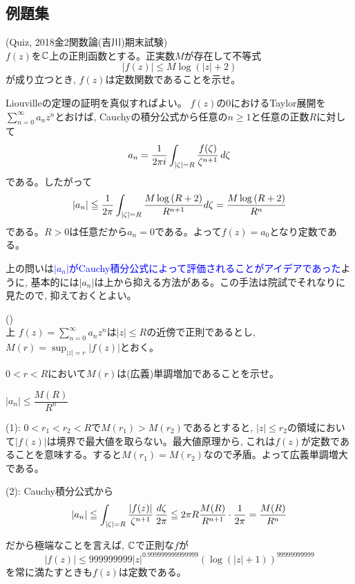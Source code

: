 \subsection{例題集} \label{subsection:c-analysis_egprobs1}
\begin{egprob} (Quiz, 2018金2関数論(吉川)期末試験)\\
$f(z)$を$\mathbb{C}$上の正則函数とする。正実数$M$が存在して不等式
\[|f(z)| \leq M\log{(|z| + 2)}\]
が成り立つとき, $f(z)$は定数関数であることを示せ。
\end{egprob}

\begin{egans} Liouvilleの定理の証明を真似すればよい。
$f(z)$の$0$におけるTaylor展開を$\sum_{n=0}^{\infty}a_nz^{n}$とおけば, Cauchyの積分公式から任意の$n\geq 1$と任意の正数$R$に対して
\[a_n = \dfrac{1}{2\pi i} \displaystyle\int_{|\zeta|=R} \dfrac{f(\zeta)}{\zeta^{n+1}}\, d\zeta\]
である。したがって
\[|a_n| \leqq \dfrac{1}{2\pi} \displaystyle\int_{|\zeta|=R} \dfrac{M\log{(R+2)}}{R^{n+1}}d\zeta = \dfrac{M\log{(R+2)}}{R^{n}}\]
である。$R>0$は任意だから$a_n=0$である。よって$f(z) = a_0$となり定数である。
\end{egans}

上の問いは\textcolor{blue}{$|a_n|$がCauchy積分公式によって評価されることがアイデアであった}ように, 基本的には$|a_n|$は上から抑える方法がある。この手法は院試でそれなりに見たので, 抑えておくとよい。


\begin{egprob} ()\\
上
$f(z) = \sum_{n=0}^{\infty}a_nz^{n}$は$|z|\leq R$の近傍で正則であるとし, $M(r) = \sup_{|z|=r}|f(z)|$とおく。
\ben
\item $0<r<R$において$M(r)$は(広義)単調増加であることを示せ。
\item $|a_n| \leq \dfrac{M(R)}{R^{n}}$
\een
\end{egprob}
\begin{egans}
(1): $0<r_1<r_2<R$で$M(r_1)>M(r_2)$であるとすると, $|z|\leq r_2$の領域において$|f(z)|$は境界で最大値を取らない。最大値原理から, これは$f(z)$が定数であることを意味する。すると$M(r_1) = M(r_2)$なので矛盾。よって広義単調増大である。

(2): Cauchy積分公式から
\[|a_n| \leqq  \displaystyle\int_{|\zeta| = R} \dfrac{|f(z)|}{\zeta^{n+1}}\, \dfrac{d\zeta}{2\pi} \leqq 2\pi R \dfrac{M(R)}{R^{n+1}}\cdot \dfrac{1}{2\pi} = \dfrac{M(R)}{R^{n}}\]
\end{egans}
だから極端なことを言えば, $\mathbb{C}$で正則な$f$が
\[|f(z)| \leq 999999999|z|^{0.999999999999999}(\log{(|z|+1)})^{99999999999}\]
を常に満たすときも$f(z)$は定数である。

